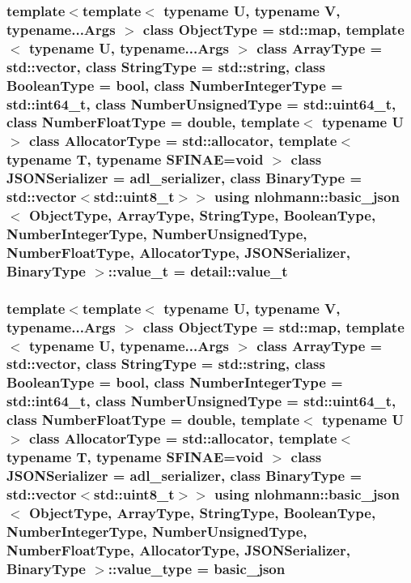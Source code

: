 \subsubsection[{\texorpdfstring{value\+\_\+t}{value_t}}]{\setlength{\rightskip}{0pt plus 5cm}template$<$template$<$ typename U, typename V, typename...\+Args $>$ class Object\+Type = std\+::map, template$<$ typename U, typename...\+Args $>$ class Array\+Type = std\+::vector, class String\+Type  = std\+::string, class Boolean\+Type  = bool, class Number\+Integer\+Type  = std\+::int64\+\_\+t, class Number\+Unsigned\+Type  = std\+::uint64\+\_\+t, class Number\+Float\+Type  = double, template$<$ typename U $>$ class Allocator\+Type = std\+::allocator, template$<$ typename T, typename S\+F\+I\+N\+A\+E=void $>$ class J\+S\+O\+N\+Serializer = adl\+\_\+serializer, class Binary\+Type  = std\+::vector$<$std\+::uint8\+\_\+t$>$$>$ using {\bf nlohmann\+::basic\+\_\+json}$<$ Object\+Type, Array\+Type, String\+Type, Boolean\+Type, Number\+Integer\+Type, Number\+Unsigned\+Type, Number\+Float\+Type, Allocator\+Type, J\+S\+O\+N\+Serializer, Binary\+Type $>$\+::{\bf value\+\_\+t} =  {\bf detail\+::value\+\_\+t}}\hypertarget{classnlohmann_1_1basic__json_ac68cb65a7f3517f0c5b1d3a4967406ad}{}\label{classnlohmann_1_1basic__json_ac68cb65a7f3517f0c5b1d3a4967406ad}
\subsubsection[{\texorpdfstring{value\+\_\+type}{value_type}}]{\setlength{\rightskip}{0pt plus 5cm}template$<$template$<$ typename U, typename V, typename...\+Args $>$ class Object\+Type = std\+::map, template$<$ typename U, typename...\+Args $>$ class Array\+Type = std\+::vector, class String\+Type  = std\+::string, class Boolean\+Type  = bool, class Number\+Integer\+Type  = std\+::int64\+\_\+t, class Number\+Unsigned\+Type  = std\+::uint64\+\_\+t, class Number\+Float\+Type  = double, template$<$ typename U $>$ class Allocator\+Type = std\+::allocator, template$<$ typename T, typename S\+F\+I\+N\+A\+E=void $>$ class J\+S\+O\+N\+Serializer = adl\+\_\+serializer, class Binary\+Type  = std\+::vector$<$std\+::uint8\+\_\+t$>$$>$ using {\bf nlohmann\+::basic\+\_\+json}$<$ Object\+Type, Array\+Type, String\+Type, Boolean\+Type, Number\+Integer\+Type, Number\+Unsigned\+Type, Number\+Float\+Type, Allocator\+Type, J\+S\+O\+N\+Serializer, Binary\+Type $>$\+::{\bf value\+\_\+type} =  {\bf basic\+\_\+json}}\hypertarget{classnlohmann_1_1basic__json_a57c816a20c1d3ccc9bbc2972829da847}{}\label{classnlohmann_1_1basic__json_a57c816a20c1d3ccc9bbc2972829da847}


